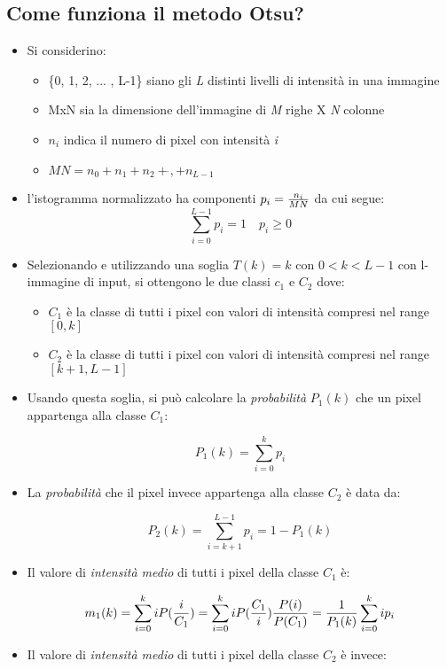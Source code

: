 \subsection{Come funziona il metodo Otsu?} 

\begin{itemize}
\item Si considerino: 

\begin{itemize}
\item \{0, 1, 2, ... , L-1\} siano gli \textit{L} distinti livelli di intensità in una immagine
\item MxN sia la dimensione dell'immagine di \textit{M} righe X \textit{N} colonne
\item $n_i$ indica il numero di pixel con intensità \textit{i}
\item $MN = n_0 + n_1 + n_2 + \dot{}, + n_{L-1}$
\end{itemize}

\item l'istogramma normalizzato ha componenti $p_i = {n_i \over MN}$ da cui segue:
$$\sum_{i=0}^{L-1} p_i = 1 \quad p_i \geq 0$$

\item Selezionando e utilizzando una soglia $T(k) = k$ con $0 < k < L-1$ con l-immagine di input, si ottengono le due classi $c_1$ e $C_2$ dove:

\begin{itemize}
\item $C_1$ è la classe di tutti i pixel con valori di intensità compresi nel range $[0, k]$
\item $C_2$ è la classe di tutti i pixel con valori di intensità compresi nel range $[k+1, L-1]$
\end{itemize}

\item Usando questa soglia, si può calcolare la \textit{probabilità} $P_1(k)$ che un pixel appartenga alla classe $C_1$:

$$
P_1(k) = \sum_{i=0}^{k} p_i
$$

\item La \textit{probabilità} che il pixel invece appartenga alla classe $C_2$ è data da:

$$
P_2(k) = \sum_{i=k+1}^{L-1} p_i = 1 - P_1(k)
$$

\item Il valore di \textit{intensità medio} di tutti i pixel della classe $C_1$ è:

$$
m_1(k) = \sum_{i=0}^{k} i P({i \over C_1}) = \sum_{i=0}^{k} i P({C_1 \over i}) {P(i) \over P(C_1)} = {1 \over P_1(k)} \sum_{i=0}^{k} i p_i
$$
\item Il valore di \textit{intensità medio} di tutti i pixel della classe $C_2$ è invece:


\end{itemize}
